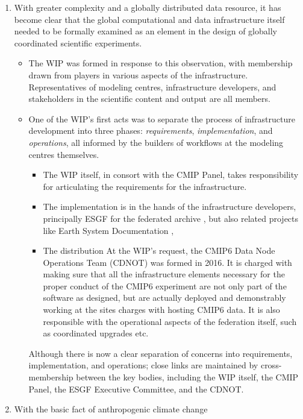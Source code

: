 \documentclass[gmd,manuscript]{copernicus}
\newcommand{\pipref}[1] {\citep{ref:#1}}
\begin{document}
\begin{enumerate}
\item With greater complexity and a globally distributed data resource, it has become clear that the
  global
  computational and data infrastructure itself needed to be formally
  examined as an element in the design of globally coordinated
  scientific experiments.
  \begin{itemize} \item The WIP was formed in response to this
  observation, with membership drawn from players in various
  aspects of the infrastructure. Representatives of modeling centres,
  infrastructure developers, and stakeholders in the scientific
  content and output are all members. 
  \item One of the WIP's first acts was
  to separate the process of infrastructure development into three
  phases: \emph{requirements}, \emph{implementation}, and
  \emph{operations}, all  informed by 
  the builders of workflows at the modeling centres
  themselves.  
  \begin{itemize}\item The WIP itself, in consort with the CMIP Panel,
  takes responsibility for articulating the requirements for the
  infrastructure. 
  \item The implementation is in the hands of 
  the infrastructure developers, principally ESGF for the federated archive
  \pipref{williamsetal2015}, but also related projects like Earth
  System Documentation
  \citep[\href{https://goo.gl/WNwKD9}{ES-DOC},][]{ref:guilyardietal2013}, 
   \item The distribution 
   At the WIP's request, the CMIP6 Data Node Operations Team
  (CDNOT) was formed in 2016. It
  is charged with making sure that all the infrastructure elements
  necessary for the proper conduct of the CMIP6 experiment are not
  only part of the software as designed, but are actually deployed and
  demonstrably working at the sites charges with hosting CMIP6 data.
  It is also responsible with the operational aspects of the
  federation itself, such as coordinated upgrades etc.
  \end{itemize}
  Although there is now a clear separation of concerns into 
  requirements, implementation, and operations; close links are
  maintained by cross-membership between the key bodies, including the
  WIP itself, the CMIP Panel, the ESGF Executive Committee, and the
  CDNOT.
  \end{itemize}
\item\label{broad} With the basic fact of anthropogenic climate change

\end{enumerate}
\end{document}
